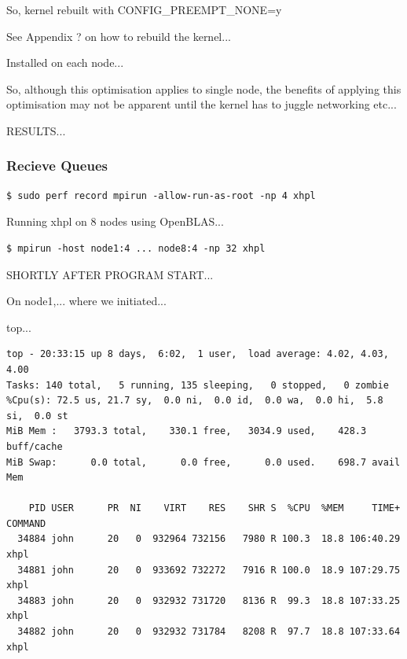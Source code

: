 \documentclass{report}
\begin{document}
So, kernel rebuilt with CONFIG\_PREEMPT\_NONE=y

See Appendix ? on how to rebuild the kernel...

Installed on each node...

So, although this optimisation applies to  single node, the benefits of applying this optimisation may not be apparent until the kernel has to juggle networking etc...

RESULTS...


%
%
\subsubsection{Recieve Queues}

\lstset{style=type}
\begin{lstlisting}
$ sudo perf record mpirun -allow-run-as-root -np 4 xhpl
\end{lstlisting}



Running xhpl on 8 nodes using OpenBLAS...

\lstset{style=type}
\begin{lstlisting}
$ mpirun -host node1:4 ... node8:4 -np 32 xhpl
\end{lstlisting}


SHORTLY AFTER PROGRAM START...

On node1,... where we initiated...

top...

\lstset{style=type}
\begin{lstlisting}
top - 20:33:15 up 8 days,  6:02,  1 user,  load average: 4.02, 4.03, 4.00
Tasks: 140 total,   5 running, 135 sleeping,   0 stopped,   0 zombie
%Cpu(s): 72.5 us, 21.7 sy,  0.0 ni,  0.0 id,  0.0 wa,  0.0 hi,  5.8 si,  0.0 st
MiB Mem :   3793.3 total,    330.1 free,   3034.9 used,    428.3 buff/cache
MiB Swap:      0.0 total,      0.0 free,      0.0 used.    698.7 avail Mem 

    PID USER      PR  NI    VIRT    RES    SHR S  %CPU  %MEM     TIME+ COMMAND                                                   
  34884 john      20   0  932964 732156   7980 R 100.3  18.8 106:40.29 xhpl                                                      
  34881 john      20   0  933692 732272   7916 R 100.0  18.9 107:29.75 xhpl                                                      
  34883 john      20   0  932932 731720   8136 R  99.3  18.8 107:33.25 xhpl                                                      
  34882 john      20   0  932932 731784   8208 R  97.7  18.8 107:33.64 xhpl                                                      
\end{lstlisting}
\end{document}
